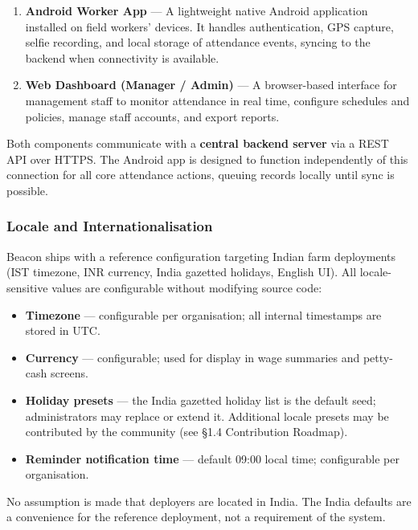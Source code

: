 \documentclass[12pt, a4paper]{article}
\begin{document}
\begin{enumerate}
    \item \textbf{Android Worker App} --- A lightweight native Android
          application installed on field workers' devices. It handles
          authentication, GPS capture, selfie recording, and local storage
          of attendance events, syncing to the backend when connectivity is
          available.
    \item \textbf{Web Dashboard (Manager / Admin)} --- A browser-based
          interface for management staff to monitor attendance in real time,
          configure schedules and policies, manage staff accounts, and
          export reports.
\end{enumerate}

Both components communicate with a \textbf{central backend server} via a
REST API over HTTPS. The Android app is designed to function independently
of this connection for all core attendance actions, queuing records locally
until sync is possible.

\subsubsection*{Locale and Internationalisation}

Beacon ships with a reference configuration targeting Indian farm
deployments (IST timezone, INR currency, India gazetted holidays, English
UI). All locale-sensitive values are configurable without modifying source
code:

\begin{itemize}
    \item \textbf{Timezone} --- configurable per organisation; all
          internal timestamps are stored in UTC.
    \item \textbf{Currency} --- configurable; used for display in wage
          summaries and petty-cash screens.
    \item \textbf{Holiday presets} --- the India gazetted holiday list
          is the default seed; administrators may replace or extend it.
          Additional locale presets may be contributed by the community
          (see \S1.4 Contribution Roadmap).
    \item \textbf{Reminder notification time} --- default 09:00 local
          time; configurable per organisation.
\end{itemize}

No assumption is made that deployers are located in India. The India
defaults are a convenience for the reference deployment, not a
requirement of the system.
\end{document}
